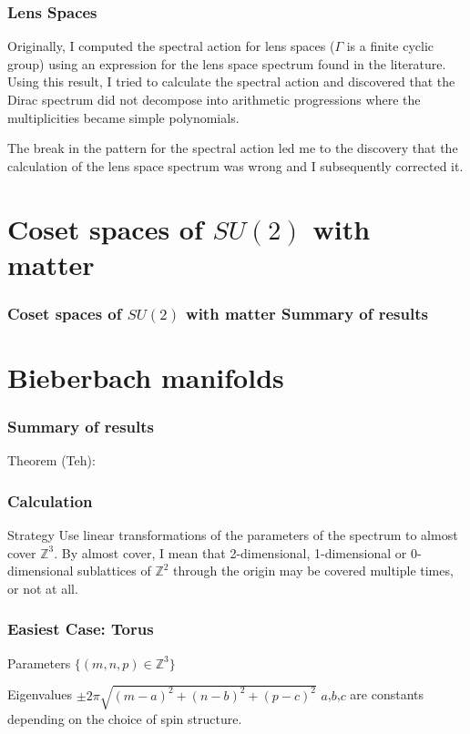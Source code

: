 \documentclass{beamer}
\def\Z{{\mathbb Z}}
\begin{document}
\begin{frame}
	\frametitle{Lens Spaces}
	\begin{block}{}
		Originally, I computed the spectral action for lens spaces ($\Gamma$ is a finite cyclic group) using an expression for the lens space spectrum found in the literature. Using this result, I tried to calculate the spectral action and discovered that the Dirac spectrum did not decompose into arithmetic progressions where the multiplicities became simple polynomials.
	\end{block}

	\pause

	\begin{block}{}
		The break in the pattern for the spectral action led me to the discovery that the calculation of the lens space spectrum was wrong and I subsequently corrected it.
	\end{block}
\end{frame}

\section{Coset spaces of $SU(2)$ with matter}
\begin{frame}
	\frametitle{Coset spaces of $SU(2)$ with matter Summary of results}
\end{frame}

\section{Bieberbach manifolds}
\begin{frame}
	\frametitle{Summary of results}
	Theorem (Teh):
\end{frame}

\begin{frame}
	\frametitle{Calculation}

	\begin{block}{Strategy}
	Use linear transformations of the parameters of the spectrum to almost cover $\Z ^3$.  By almost cover, I mean that 2-dimensional, 1-dimensional or 0-dimensional sublattices of $\Z^2$ through the origin may be covered multiple times, or not at all.
	\end{block}
\end{frame}

\begin{frame}
	\frametitle{Easiest Case: Torus}
	\begin{block}{Parameters}
		$\{(m,n,p) \in \Z ^3 \}$
	\end{block}
	\begin{block}{Eigenvalues}
		$\pm 2 \pi \sqrt{(m-a)^2 + (n-b)^2 + (p-c)^2}$
		$a$,$b$,$c$ are constants depending on the choice of spin structure.
	\end{block}
\end{frame}
\end{document}
